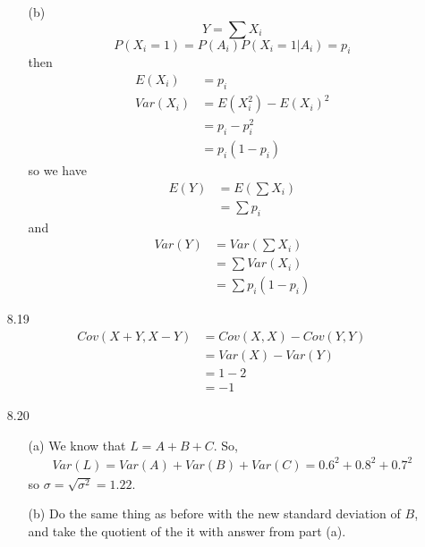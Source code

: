\documentclass[english, 11pt]{article}
\begin{document}
\begin{itemize}
\begin{itemize}
    \item[(b)]
    \[ Y = \sum X_i \]
    \[  P(X_i = 1) = P(A_i)P(X_i = 1|A_i) = p_i \]
    then
    \begin{align*}
      E(X_i) & = p_i \\
      Var(X_i) & = E(X_i^2) - E(X_i)^2 \\
      & = p_i - p_i^2 \\
      & = p_i(1-p_i)
    \end{align*}
    so we have
    \begin{align*}
      E(Y) & = E \left( \sum X_i \right) \\
           & = \sum p_i
    \end{align*}
    and
    \begin{align*}
      Var(Y) & = Var \left( \sum X_i \right) \\
             & = \sum Var(X_i) \\
             & = \sum p_i(1-p_i)
    \end{align*}
  \end{itemize}

  \item[8.19]
  \begin{align*}
    Cov(X+Y, X - Y) & = Cov(X, X) - Cov(Y,Y) \\
                    & = Var(X) - Var(Y) \\
                    & = 1 - 2 \\
                    & = -1
  \end{align*}

  \item[8.20]
  \begin{itemize}
    \item[(a)]
    We know that $L = A + B + C$. So,
    \begin{align*}
      Var(L) = Var(A) + Var(B) + Var(C) =  0.6^2 + 0.8^2 + 0.7^2
    \end{align*}
    so $\sigma = \sqrt{\sigma^2} = 1.22$.
    \item[(b)]
    Do the same thing as before with the new standard deviation of $B$, and take the quotient of the it with answer from part (a).
  \end{itemize}


\end{itemize}
\end{document}
